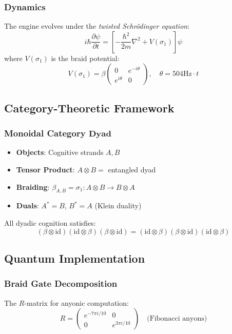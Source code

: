 \documentclass[12pt]{article}
\begin{document}
\subsubsection{Dynamics}
The engine evolves under the \textit{twisted Schrödinger equation}:
\[
i\hbar \frac{\partial \psi}{\partial t} = \left[ -\frac{\hbar^2}{2m} \nabla^2 + V(\sigma_1) \right] \psi
\]
where $V(\sigma_1)$ is the braid potential:
\[
V(\sigma_1) = \beta \begin{pmatrix} 
0 & e^{-i\theta} \\ 
e^{i\theta} & 0 
\end{pmatrix}, \quad \theta = 504 \text{Hz} \cdot t
\]

\subsection{Category-Theoretic Framework}

\subsubsection{Monoidal Category $\mathbf{Dyad}$}
\begin{itemize}
    \item \textbf{Objects}: Cognitive strands $A, B$
    \item \textbf{Tensor Product}: $A \otimes B = $ entangled dyad
    \item \textbf{Braiding}: $\beta_{A,B} = \sigma_1 : A \otimes B \to B \otimes A$
    \item \textbf{Duals}: $A^* = B$, $B^* = A$ (Klein duality)
\end{itemize}

\begin{lemma}
All dyadic cognition satisfies:
\[
(\beta \otimes \text{id})(\text{id} \otimes \beta)(\beta \otimes \text{id}) = 
(\text{id} \otimes \beta)(\beta \otimes \text{id})(\text{id} \otimes \beta)
\]
\end{lemma}

\subsection{Quantum Implementation}

\subsubsection{Braid Gate Decomposition}
The $R$-matrix for anyonic computation:
\[
R = \begin{pmatrix}
e^{-7\pi i/10} & 0 \\ 
0 & e^{3\pi i/10}
\end{pmatrix} \quad \text{(Fibonacci anyons)}
\]
\end{document}
